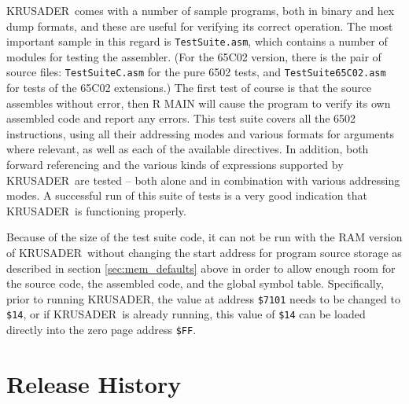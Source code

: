 \documentclass[12pt]{article}
\newcommand{\replica}[1]{\textsf{#1}}
\newcommand{\krusader}{\textsf{KRUSADER}}
\begin{document}
\krusader\ comes with a number of sample programs, both in binary and hex dump formats,
and these are useful for verifying its correct operation.  The most important sample in this regard
is \texttt{TestSuite.asm}, which contains a number of modules for testing the
assembler.  (For the 65C02 version, there is the pair of source files:
\texttt{TestSuiteC.asm} for the pure 6502 tests, and \texttt{TestSuite65C02.asm} for tests of the 65C02 extensions.)
The first test of course is that the source assembles without error, 
then \replica{R MAIN} will cause the program to verify its own assembled code and report any errors.
This test suite covers all the 6502 instructions, using all their addressing 
modes and various formats for arguments where relevant, as well as 
each of the available directives.  
In addition, both forward referencing and the various kinds of expressions 
supported by \krusader\ are tested -- both alone and in combination with various addressing modes.  A successful run of this suite of tests is a very good indication that \krusader\ is functioning properly.

Because of the size of the test suite code, it can not be run with the RAM version
of \krusader\ without changing the start address for program source storage as
described in section \ref{sec:mem_defaults} above in order
to allow enough room for the source code, the assembled code, and the global symbol table.
Specifically, prior to running \krusader, the value at address \texttt{\$7101} needs to be changed to \texttt{\$14}, or if \krusader\ is already running, this value of \texttt{\$14} 
can be loaded directly into the zero page address \texttt{\$FF}.



\clearpage
\section{Release History}
\label{sec:history}
\end{document}
